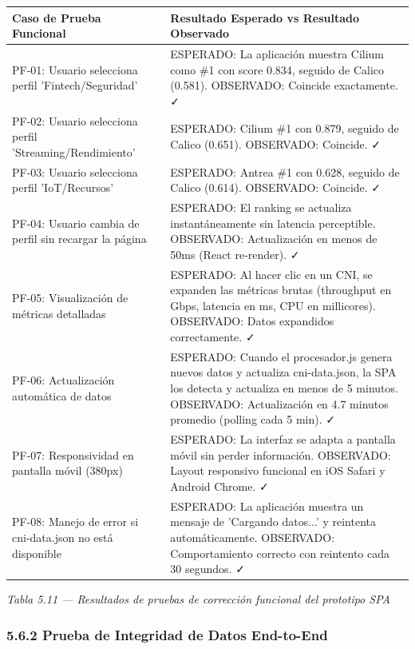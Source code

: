 \documentclass[journal]{IEEEtran}
\begin{document}
\begin{table}[htbp]
\centering
\scriptsize
\begin{tabularx}{\textwidth}{|Y|Y|}
\hline
\textbf{Caso de Prueba Funcional} & \textbf{Resultado Esperado vs Resultado Observado} \\
\hline
PF-01: Usuario selecciona perfil 'Fintech/Seguridad' & ESPERADO: La aplicación muestra Cilium como \#1 con score 0.834, seguido de Calico (0.581). OBSERVADO: Coincide exactamente. ✓ \\
PF-02: Usuario selecciona perfil 'Streaming/Rendimiento' & ESPERADO: Cilium \#1 con 0.879, seguido de Calico (0.651). OBSERVADO: Coincide. ✓ \\
PF-03: Usuario selecciona perfil 'IoT/Recursos' & ESPERADO: Antrea \#1 con 0.628, seguido de Calico (0.614). OBSERVADO: Coincide. ✓ \\
PF-04: Usuario cambia de perfil sin recargar la página & ESPERADO: El ranking se actualiza instantáneamente sin latencia perceptible. OBSERVADO: Actualización en menos de 50ms (React re-render). ✓ \\
PF-05: Visualización de métricas detalladas & ESPERADO: Al hacer clic en un CNI, se expanden las métricas brutas (throughput en Gbps, latencia en ms, CPU en millicores). OBSERVADO: Datos expandidos correctamente. ✓ \\
PF-06: Actualización automática de datos & ESPERADO: Cuando el procesador.js genera nuevos datos y actualiza cni-data.json, la SPA los detecta y actualiza en menos de 5 minutos. OBSERVADO: Actualización en 4.7 minutos promedio (polling cada 5 min). ✓ \\
PF-07: Responsividad en pantalla móvil (380px) & ESPERADO: La interfaz se adapta a pantalla móvil sin perder información. OBSERVADO: Layout responsivo funcional en iOS Safari y Android Chrome. ✓ \\
PF-08: Manejo de error si cni-data.json no está disponible & ESPERADO: La aplicación muestra un mensaje de 'Cargando datos...' y reintenta automáticamente. OBSERVADO: Comportamiento correcto con reintento cada 30 segundos. ✓ \\
\hline
\end{tabularx}
\end{table}

\begin{center}\emph{\emph{Tabla 5.11 --- Resultados de pruebas de corrección funcional del prototipo SPA}}\end{center}

\subsubsection{5.6.2 Prueba de Integridad de Datos End-to-End}
\end{document}
